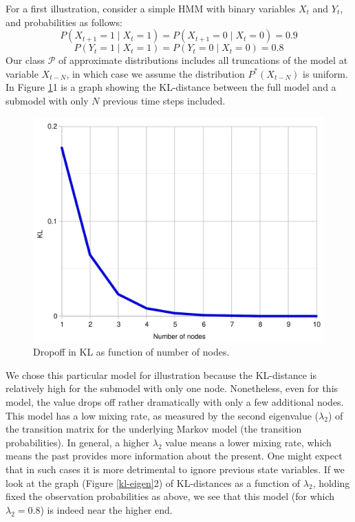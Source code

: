 \documentclass[10pt,letterpaper]{article}
\begin{document}
For a first illustration, consider a simple HMM with binary variables $X_t$ and $Y_t$, and probabilities as follows:
$$P(X_{t+1}=1\mid X_t=1) = P(X_{t+1}=0\mid X_t=0) = 0.9$$
$$P(Y_{t}=1\mid X_t=1) = P(Y_{t}=0\mid X_t=0) = 0.8$$
Our class $\mathcal{P}$ of approximate distributions includes all truncations of the model at variable $X_{t-N}$, in which case we assume the distribution $P^{*}(X_{t-N})$ is uniform. In Figure \ref{hmm}1 is a graph showing the KL-distance between the full model and a submodel with only $N$ previous time steps included.
 \begin{figure}[h]  \begin{center}
\includegraphics[scale=0.3]{hmm1.pdf} \caption{Dropoff in KL as function of number of nodes.} \end{center} 
\label{hmm}\end{figure} 
We chose this particular model for illustration because the KL-distance is relatively high for the submodel with only one node. Nonetheless, even for this model, the value drops off rather dramatically with only a few additional nodes. This model has a low mixing rate, as measured by the second eigenvalue ($\lambda_2$) of the transition matrix for the underlying Markov model (the transition probabilities). In general, a higher $\lambda_2$ value means a lower mixing rate, which means the past provides more information about the present. One might expect that in such cases it is more detrimental to ignore previous state variables. If we look at the graph (Figure \ref{kl-eigen}2) of KL-distances as a function of $\lambda_2$, holding fixed the observation probabilities as above, we see that this model (for which $\lambda_2 = 0.8$) is indeed near the higher end.
\end{document}
